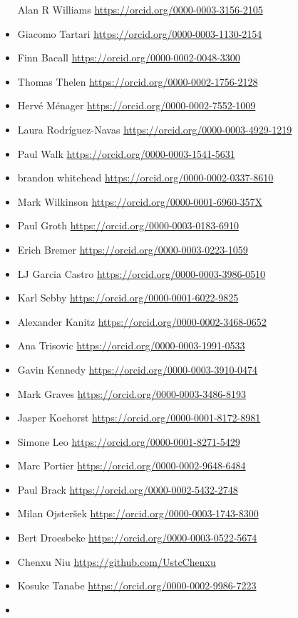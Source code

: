 \begin{itemize}
  Alan R Williams \url{https://orcid.org/0000-0003-3156-2105}
\item
  Giacomo Tartari \url{https://orcid.org/0000-0003-1130-2154}
\item
  Finn Bacall \url{https://orcid.org/0000-0002-0048-3300}
\item
  Thomas Thelen \url{https://orcid.org/0000-0002-1756-2128}
\item
  Hervé Ménager \url{https://orcid.org/0000-0002-7552-1009}
\item
  Laura Rodríguez-Navas \url{https://orcid.org/0000-0003-4929-1219}
\item
  Paul Walk \url{https://orcid.org/0000-0003-1541-5631}
\item
  brandon whitehead \url{https://orcid.org/0000-0002-0337-8610}
\item
  Mark Wilkinson \url{https://orcid.org/0000-0001-6960-357X}
\item
  Paul Groth \url{https://orcid.org/0000-0003-0183-6910}
\item
  Erich Bremer \url{https://orcid.org/0000-0003-0223-1059}
\item
  LJ Garcia Castro \url{https://orcid.org/0000-0003-3986-0510}
\item
  Karl Sebby \url{https://orcid.org/0000-0001-6022-9825}
\item
  Alexander Kanitz \url{https://orcid.org/0000-0002-3468-0652}
\item
  Ana Trisovic \url{https://orcid.org/0000-0003-1991-0533}
\item
  Gavin Kennedy \url{https://orcid.org/0000-0003-3910-0474}
\item
  Mark Graves \url{https://orcid.org/0000-0003-3486-8193}
\item
  Jasper Koehorst \url{https://orcid.org/0000-0001-8172-8981}
\item
  Simone Leo \url{https://orcid.org/0000-0001-8271-5429}
\item
  Marc Portier \url{https://orcid.org/0000-0002-9648-6484}
\item
  Paul Brack \url{https://orcid.org/0000-0002-5432-2748}
\item
  Milan Ojsteršek \url{https://orcid.org/0000-0003-1743-8300}
\item
  Bert Droesbeke \url{https://orcid.org/0000-0003-0522-5674}
\item
  Chenxu Niu \url{https://github.com/UstcChenxu}
\item
  Kosuke Tanabe \url{https://orcid.org/0000-0002-9986-7223}
\item

\end{itemize}
